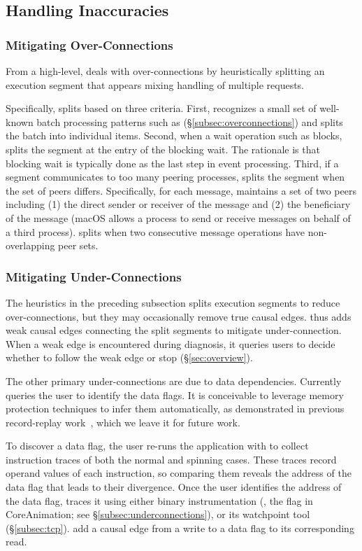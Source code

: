 \subsection{Handling Inaccuracies} \label{subsec:handle}

\subsubsection{Mitigating Over-Connections}\label{subsec:fix-over}

From a high-level, \xxx deals with over-connections by heuristically splitting
an execution segment that appears mixing handling of multiple requests.

Specifically, \xxx splits based on three criteria. First, \xxx recognizes a small
set of well-known batch processing patterns such as 
(\S\ref{subsec:overconnections}) and splits the batch into individual items. Second,
when a wait operation such as  blocks, \xxx splits the segment at the
entry of the blocking wait. The rationale is that blocking wait is typically
done as the last step in event processing. Third, if a segment
communicates to too many peering processes, \xxx splits the segment when the
set of peers differs. Specifically, for each message, \xxx maintains a set
of two peers including (1) the direct sender or receiver of the message and
(2) the beneficiary of the message (macOS allows a process to send or receive
messages on behalf of a third process). \xxx splits when two consecutive message
operations have non-overlapping peer sets.

\subsubsection{Mitigating Under-Connections}\label{subsec:fix-under}

The heuristics in the preceding subsection splits execution segments to
reduce over-connections, but they may occasionally remove true causal
edges. \xxx thus adds weak causal edges connecting the split segments to
mitigate under-connection. When a weak edge is encountered during
diagnosis, it queries users to decide whether to follow the weak edge or
stop (\S\ref{sec:overview}).

The other primary under-connections are due to data
dependencies. Currently \xxx queries the user to identify the data
flags. It is conceivable to leverage memory protection techniques to infer
them automatically, as demonstrated in previous record-replay
work~\cite{king2005debugging, dunlap2008execution}, which we leave it for
future work.

To discover a data flag, the user re-runs the application with \xxx to
collect instruction traces of both the normal and spinning cases.  These
traces record operand values of each instruction, so comparing them
reveals the address of the data flag that leads to their divergence.  Once
the user identifies the address of the data flag, \xxx traces it using
either binary instrumentation (\eg, the  flag in
CoreAnimation; see \S\ref{subsec:underconnections}), or its watchpoint
tool (\S\ref{subsec:tcp}). \xxx add a causal edge from a write to a data
flag to its corresponding read.
